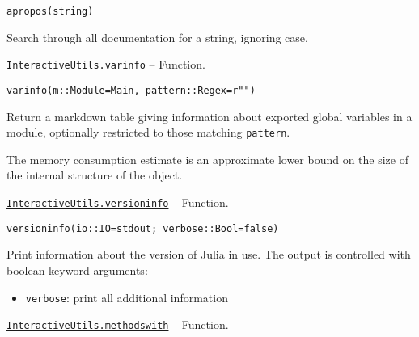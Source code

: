 \begin{adjustwidth}{2em}{0pt}


\begin{verbatim}
apropos(string)
\end{verbatim}

Search through all documentation for a string, ignoring case.



\end{adjustwidth}
\hypertarget{18269429703422902914}{} 
\hyperlink{18269429703422902914}{\texttt{InteractiveUtils.varinfo}}  -- {Function.}

\begin{adjustwidth}{2em}{0pt}


\begin{verbatim}
varinfo(m::Module=Main, pattern::Regex=r"")
\end{verbatim}

Return a markdown table giving information about exported global variables in a module, optionally restricted to those matching \texttt{pattern}.

The memory consumption estimate is an approximate lower bound on the size of the internal structure of the object.



\end{adjustwidth}
\hypertarget{11698106121547091928}{} 
\hyperlink{11698106121547091928}{\texttt{InteractiveUtils.versioninfo}}  -- {Function.}

\begin{adjustwidth}{2em}{0pt}


\begin{verbatim}
versioninfo(io::IO=stdout; verbose::Bool=false)
\end{verbatim}

Print information about the version of Julia in use. The output is controlled with boolean keyword arguments:

\begin{itemize}
\item \texttt{verbose}: print all additional information

\end{itemize}


\end{adjustwidth}
\hypertarget{1845157398882896709}{} 
\hyperlink{1845157398882896709}{\texttt{InteractiveUtils.methodswith}}  -- {Function.}

